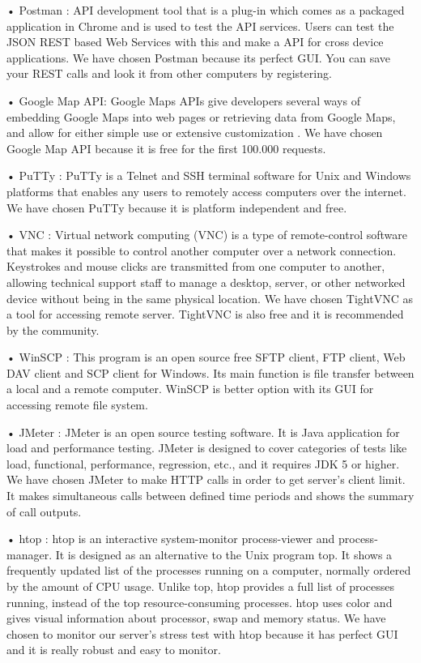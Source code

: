 • Postman : API development tool that is a plug-in which comes as a packaged application in Chrome and is used to test the API services. Users can test the JSON REST based Web Services with this and make a API for cross device applications. 
\cite{PostmanTanim}
We have chosen Postman because its perfect GUI. You can save your REST calls and look it from other computers by registering. 

• Google Map API: Google Maps APIs give developers several ways of embedding Google Maps into web pages or retrieving data from Google Maps, and allow for either simple use or extensive customization \cite{googleMapAPI}. 
We have chosen Google Map API because it is free for the first 100.000 requests.

• PuTTy : PuTTy is a Telnet and SSH terminal software for Unix and Windows platforms that enables any users to remotely access computers over the internet. 
\cite{PuttyTanim}
We have chosen PuTTy because it is platform independent and free.

• VNC : Virtual network computing (VNC) is a type of remote-control software that makes it possible to control another computer over a network connection. Keystrokes and mouse clicks are transmitted from one computer to another, allowing technical support staff to manage a desktop, server, or other networked device without being in the same physical location. 
\cite{VNCTanim}
We have chosen TightVNC as a tool for accessing remote server. TightVNC is also free and it is recommended by the community.

• WinSCP : This program is an open source free SFTP client, FTP client, Web DAV client and SCP client for Windows. Its main function is file transfer between a local and a remote computer.
\cite{WinSCPTanim}
 WinSCP is better option with its GUI for accessing remote file system. 
 
• JMeter : JMeter is an open source testing software. It is Java application for load and performance testing. JMeter is designed to cover categories of tests like load, functional, performance, regression, etc., and it requires JDK 5 or higher. \cite{JMeterTanim}
We have chosen JMeter to make HTTP calls in order to get server's client limit. It makes simultaneous calls between defined time periods and shows the summary of call outputs.

• htop : htop is an interactive system-monitor process-viewer and process-manager. It is designed as an alternative to the Unix program top. It shows a frequently updated list of the processes running on a computer, normally ordered by the amount of CPU usage. Unlike top, htop provides a full list of processes running, instead of the top resource-consuming processes. htop uses color and gives visual information about processor, swap and memory status.\cite{htopTanim}
We have chosen to monitor our server's stress test with htop because it has perfect GUI and it is really robust and easy to monitor.

